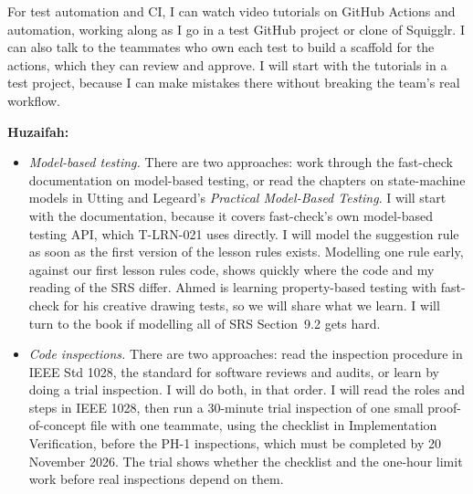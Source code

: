 \documentclass[12pt, titlepage]{article}
\begin{document}
\begin{enumerate}
For test automation and CI, I can watch video tutorials on GitHub Actions and automation, working along as I go in a test GitHub project or clone of Squigglr.
I can also talk to the teammates who own each test to build a scaffold for the
actions, which they can review and approve.
I will start with the tutorials in a test project, because I can make mistakes
there without breaking the team's real workflow.

\textbf{Huzaifah:}
\begin{itemize}
\item \emph{Model-based testing.} There are two approaches: work through
the fast-check documentation on model-based testing, or read the chapters
on state-machine models in Utting and Legeard's \emph{Practical Model-Based
Testing}. I will start with the documentation, because it covers
fast-check's own model-based testing API, which T-LRN-021 uses directly.
I will model the suggestion rule as soon as the first version of the lesson
rules exists. Modelling one rule early, against our first lesson rules code,
shows quickly where the code and my reading of the SRS differ. Ahmed is
learning property-based testing with fast-check for his creative drawing
tests, so we will share what we learn. I will turn to the book if modelling
all of SRS Section~9.2 gets hard.
\item \emph{Code inspections.} There are two approaches: read the
inspection procedure in IEEE Std 1028, the standard for software reviews and
audits, or learn by doing a trial inspection. I will do both, in that order.
I will read the
roles and steps in IEEE 1028, then run a 30-minute trial inspection of one
small proof-of-concept file with one teammate, using the checklist in Implementation
Verification, before the PH-1 inspections, which must be completed by
20 November 2026. The trial shows whether the checklist and the one-hour
limit work before real inspections depend on them.
\end{itemize}


\end{enumerate}
\end{document}
